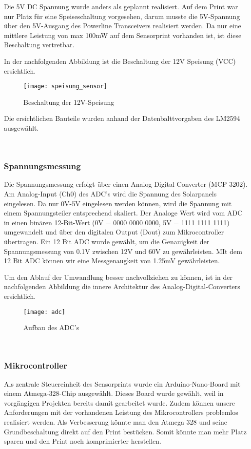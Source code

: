 Die 5V DC Spannung wurde anders als geplannt realisiert. Auf dem Print war nur Platz für eine Speiseschaltung vorgesehen, darum musste die 5V-Spannung über den 5V-Ausgang des Powerline Transceivers realisiert werden. Da nur eine mittlere Leistung von max 100mW auf dem Sensorprint vorhanden ist, ist diese Beschaltung vertretbar.

In der nachfolgenden Abbildung ist die Beschaltung der 12V Speisung (VCC) ersichtlich.


\begin{figure}[h]
\centering
\texttt{[image: speisung\_sensor]}
\caption{Beschaltung der 12V-Speisung}
\end{figure}

Die ersichtlichen Bauteile wurden anhand der Datenbalttvorgaben des LM2594 \cite{DCDC_Regulator_LM2594} ausgewählt.

\
\
\subsubsection{Spannungsmessung}
Die Spannungsmessung erfolgt über einen Analog-Digital-Converter (MCP 3202). Am Analog-Input (Ch0) des ADC's wird die Spannung des Solarpanels eingelesen. Da nur 0V-5V eingelesen werden können, wird die Spannung mit einem Spannungsteiler entsprechend skaliert. Der Analoge Wert wird vom ADC in einen binären 12-Bit-Wert (0V = 0000 0000 0000, 5V = 1111 1111 1111) umgewandelt und über den digitalen Output (Dout) zum Mikrocontroller übertragen. Ein 12 Bit ADC wurde gewählt, um die Genauigkeit der Spannungsmessung von 0.1V zwischen 12V und 60V zu gewährleisten. MIt dem 12 Bit ADC können wir eine Messgenaugkeit von 1.25mV gewährleisten.

Um den Ablauf der Umwandlung besser nachvollziehen zu können, ist in der nachfolgenden Abbildung die innere Architektur des Analog-Digital-Converters ersichtlich.

\clearpage
\begin{figure}[h]
\centering
\texttt{[image: adc]}
\caption{Aufbau des ADC's \cite{Datasheet_adc}}
\end{figure}

\
\

\subsubsection{Mikrocontroller}
Als zentrale Steuereinheit des Sensorprints wurde ein Arduino-Nano-Board mit einem Atmega-328-Chip ausgewählt. Dieses Board wurde gewählt, weil in vorgängigen Projekten bereits damit gearbeitet wurde. Zudem können unsere Anforderungen mit der vorhandenen Leistung des Mikrocontrollers problemlos realisiert werden. Als Verbesserung könnte man den Atmega 328 und seine Grundbeschaltung direkt auf den Print bestücken. Somit könnte man mehr Platz sparen und den Print noch komprimierter herstellen.

